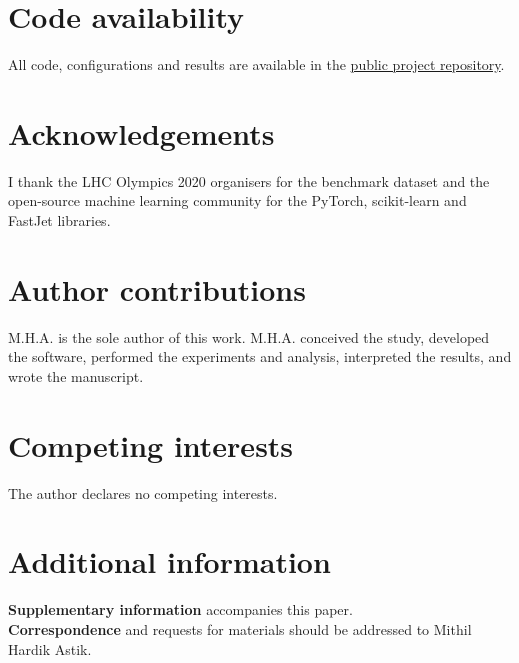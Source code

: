 \documentclass[11pt,a4paper]{article}
\begin{document}
\section*{Code availability}
All code, configurations and results are available in the
\href{https://github.com/lihtim-kitsa/lhc-olympics-2020}{public project repository}.

\section*{Acknowledgements}
I thank the LHC Olympics 2020 organisers for the benchmark dataset
and the open-source machine learning community for the PyTorch, scikit-learn
and FastJet libraries.

\section*{Author contributions}
M.H.A. is the sole author of this work. M.H.A. conceived the study, developed the software, performed the experiments and analysis, interpreted the results, and wrote the manuscript.

\section*{Competing interests}
The author declares no competing interests.

\section*{Additional information}
\textbf{Supplementary information} accompanies this paper.\\
\textbf{Correspondence} and requests for materials should be addressed to Mithil Hardik Astik.
\end{document}
